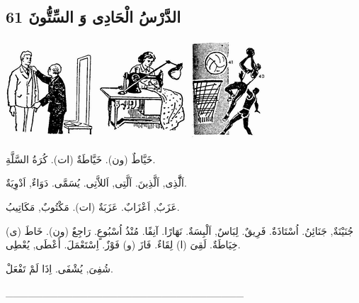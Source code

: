 \documentclass[a5paper]{article}
\begin{document}
\subsection{الدَّرْسُ الْحَادِى وَ السِّتُّونَ 61}
 \includegraphics[width=1.3126in,height=1.3335in]{MuhammadBagauddinlatinized-img196.png}   \includegraphics[width=1.3126in,height=1.3335in]{MuhammadBagauddinlatinized-img197.png}   \includegraphics[width=1.1354in,height=1.4583in]{MuhammadBagauddinlatinized-img198.png} 

خَيَّاطٌ (ون). خَيَّاطَةٌ (ات). كُرَةُ السَّلَّةِ. 

اَلَّّذِى, اَلَّذِينَ. اَلَّتِى, اَللاَّتِى. يُسَمَّى. دَوَاءٌ, اَدْوِيَةٌ. 

عَزَبٌ, اَعْزَابٌ. عَزَبَةٌ (ات). مَكْتُوبٌ, مَكَاتِيبُ. 

جُنَيْنَةٌ, جَنَائِنُ. اُسْتَاذَةٌ. فَرِيقٌ. لِبَاسٌ, اَلْبِسَةٌ. نَهَارًا. آنِفًا. مُنْذُ اُسْبُوعٍ. رَاجِعٌ (ون). خَاطَ (ى) خِيَاطَةٌ. لَقِىَ (ا) لِقَاءٌ. فَازَ (و) فَوْزٌ. اِسْتَعْمَلَ. أَعْطَى, يُعْطِى. 

شُفِىَ, يُشْفَى. اِذَا لَمْ تَفْعَلْ. 

\_\_\_\_\_\_\_\_\_\_\_\_\_\_\_\_\_\_\_\_\_\_\_\_\_\_\_\_\_\_\_\_
\end{document}

